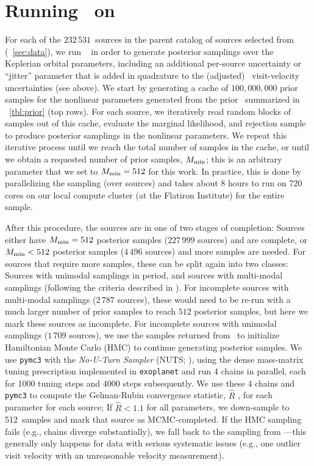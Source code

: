 \documentclass[modern]{aastex63}
\newcommand{\nsources}{\ensuremath{232\,531}}
\newcommand{\Kmin}{M_{\rm min}}
\newcommand{\Kminval}{512}
\begin{document}
\section{Running \thejoker\ on \apogee\ } \label{sec:rundr16}

For each of the \nsources\ sources in the parent catalog of sources selected
from \apogee\  (\sectionname~\ref{sec:data}), we run \thejoker\
\citep{thejoker} in order to generate posterior samplings over the Keplerian
orbital parameters, including an additional per-source uncertainty or ``jitter''
parameter that is added in quadrature to the (adjusted) \apogee\ visit-velocity
uncertainties (see above).
We start by generating a cache of $100,000,000$ prior samples for the nonlinear
parameters generated from the prior \pdf\ summarized in
\tablename~\ref{tbl:prior} (top rows).
For each source, we iteratively read random blocks of samples out of this cache,
evaluate the marginal likelihood, and rejection sample to produce posterior
samplings in the nonlinear parameters.
We repeat this iterative process until we reach the total number of samples in
the cache, or until we obtain a requested number of prior samples, $\Kmin$; this
is an arbitrary parameter that we set to $\Kmin = \Kminval$ for this work.
In practice, this is done by parallelizing the sampling (over sources) and takes
about 8 hours to run on 720 cores on our local compute cluster (at the Flatiron
Institute) for the entire sample.

After this procedure, the sources are in one of two stages of completion:
Sources either have $\Kmin = \Kminval$ posterior samples ($227\,999$ sources)
and are complete, or $\Kmin < \Kminval$ posterior samples ($4\,496$ sources) and
more samples are needed.
For sources that require more samples, these can be split again into two
classes: Sources with unimodal samplings in period, and sources with multi-modal
samplings (following the criteria described in \citealt{thejoker}).
For incomplete sources with multi-modal samplings ($2\,787$ sources), these
would need to be re-run with a much larger number of prior samples to reach
$\Kminval$ posterior samples, but here we mark these sources as incomplete.
For incomplete sources with unimodal samplings ($1\,709$ sources), we use the
samples returned from \thejoker\ to initialize Hamiltonian Monte Carlo (HMC) to
continue generating posterior samples.
We use \texttt{pymc3} with the \emph{No-U-Turn Sampler} (NUTS; \citealt{NUTS}),
using the dense mass-matrix tuning prescription implemented in
\texttt{exoplanet} \citep{exoplanet:exoplanet} and run 4 chains in parallel,
each for 1000 tuning steps and 4000 steps subsequently.
We use these 4 chains and \texttt{pymc3} to compute the Gelman-Rubin convergence
statistic, $\hat{R}$ \citep{Gelman:1992}, for each parameter for each source; If
$\hat{R} < 1.1$ for all parameters, we down-sample to \Kminval\ samples and mark
that source as MCMC-completed.
If the HMC sampling fails (e.g., chains diverge substantially), we fall back to
the sampling from \thejoker---this generally only happens for data with serious
systematic issues (e.g., one outlier visit velocity with an unreasonable
velocity measurement).
\end{document}
